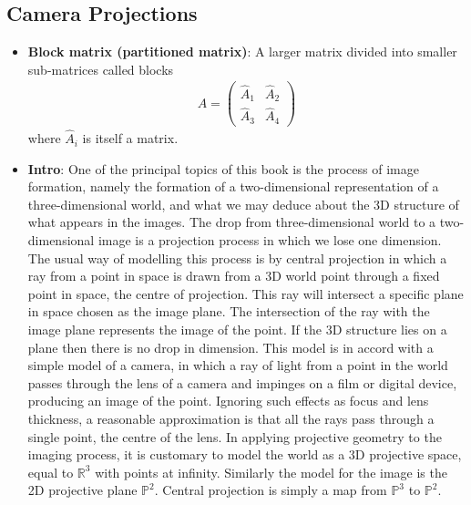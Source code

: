 \documentclass{report}
\begin{document}
\begin{itemize}
    \end{itemize}

    \pagebreak 
    \subsection{Camera Projections}
    \begin{itemize}
        \item \textbf{Block matrix (partitioned matrix)}: A larger matrix divided into smaller sub-matrices called blocks
            \begin{align*}
                A = \begin{pmatrix} \hat{A}_{1} & \hat{A}_{2} \\ \hat{A}_{3} & \hat{A}_{4} \end{pmatrix}
            \end{align*}
            where $\hat{A}_{i}$ is itself a matrix.
        \item \textbf{Intro}: One of the principal topics of this book is the process of image formation, namely the formation of a two-dimensional representation of a three-dimensional world, and what we may deduce about the 3D structure of what appears in the images.        
            \bigbreak \noindent 
            The drop from three-dimensional world to a two-dimensional image is a projection process in which we lose one dimension. The usual way of modelling this process is by central projection in which a ray from a point in space is drawn from a 3D world point through a fixed point in space, the centre of projection. This ray will intersect a specific plane in space chosen as the image plane. The intersection of the ray with the image plane represents the image of the point. If the 3D structure lies on a plane then there is no drop in dimension.
            \bigbreak \noindent 
            This model is in accord with a simple model of a camera, in which a ray of light from a point in the world passes through the lens of a camera and impinges on a film or digital device, producing an image of the point. Ignoring such effects as focus and lens thickness, a reasonable approximation is that all the rays pass through a single point, the centre of the lens.
            \bigbreak \noindent 
            In applying projective geometry to the imaging process, it is customary to model the world as a 3D projective space, equal to $\mathbb{R}^{3}$ with points at infinity.
            \bigbreak \noindent 
            Similarly the model for the image is the 2D projective plane $\mathbb{P}^{2}$. Central projection is simply a map from $\mathbb{P}^{3}$ to $\mathbb{P}^{2}$.

\end{itemize}
\end{document}
